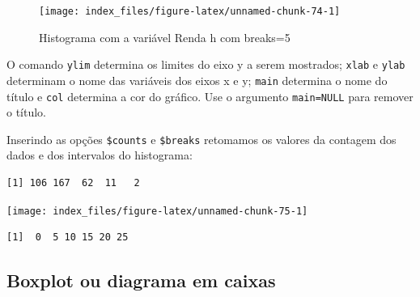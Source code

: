 \documentclass[12pt,brazil,oneside]{book}
\newenvironment{Shaded}{\begin{snugshade}}{\end{snugshade}}
\newcommand{\DataTypeTok}[1]{\textcolor[rgb]{0.13,0.29,0.53}{#1}}
\newcommand{\DecValTok}[1]{\textcolor[rgb]{0.00,0.00,0.81}{#1}}
\newcommand{\KeywordTok}[1]{\textcolor[rgb]{0.13,0.29,0.53}{\textbf{#1}}}
\newcommand{\NormalTok}[1]{#1}
\newcommand{\OperatorTok}[1]{\textcolor[rgb]{0.81,0.36,0.00}{\textbf{#1}}}
\newcommand{\StringTok}[1]{\textcolor[rgb]{0.31,0.60,0.02}{#1}}
\begin{document}
\begin{figure}[H]

{\centering \texttt{[image: index\_files/figure-latex/unnamed-chunk-74-1]} 

}

\caption{Histograma com a variável Renda h com breaks=5}\label{fig:unnamed-chunk-74}
\end{figure}

O comando \texttt{ylim} determina os limites do eixo y a serem mostrados; \texttt{xlab} e \texttt{ylab} determinam o nome das variáveis dos eixos x e y; \texttt{main} determina o nome do título e \texttt{col} determina a cor do gráfico. Use o argumento \texttt{main=NULL} para remover o título.

Inserindo as opções \texttt{\$counts} e \texttt{\$breaks} retomamos os valores da contagem dos dados e dos intervalos do histograma:

\begin{Shaded}
\end{Shaded}

\begin{verbatim}
[1] 106 167  62  11   2
\end{verbatim}

\begin{Shaded}
\end{Shaded}

\begin{center}\texttt{[image: index\_files/figure-latex/unnamed-chunk-75-1]} \end{center}

\begin{verbatim}
[1]  0  5 10 15 20 25
\end{verbatim}

\hypertarget{boxplot-ou-diagrama-em-caixas}{%
\subsection{Boxplot ou diagrama em caixas}\label{boxplot-ou-diagrama-em-caixas}}
\end{document}
